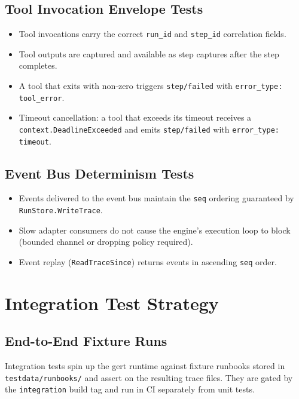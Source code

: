 \subsection{Tool Invocation Envelope Tests}

\begin{itemize}
  \item Tool invocations carry the correct \texttt{run\_id} and \texttt{step\_id} correlation fields.
  \item Tool outputs are captured and available as step captures after the step completes.
  \item A tool that exits with non-zero triggers \texttt{step/failed} with \texttt{error\_type: tool\_error}.
  \item Timeout cancellation: a tool that exceeds its timeout receives a \texttt{context.DeadlineExceeded} and emits \texttt{step/failed} with \texttt{error\_type: timeout}.
\end{itemize}

\subsection{Event Bus Determinism Tests}

\begin{itemize}
  \item Events delivered to the event bus maintain the \texttt{seq} ordering guaranteed by \texttt{RunStore.WriteTrace}.
  \item Slow adapter consumers do not cause the engine's execution loop to block (bounded channel or dropping policy required).
  \item Event replay (\texttt{ReadTraceSince}) returns events in ascending \texttt{seq} order.
\end{itemize}

\section{Integration Test Strategy}

\subsection{End-to-End Fixture Runs}

Integration tests spin up the gert runtime against fixture runbooks stored in \texttt{testdata/runbooks/} and assert on the resulting trace files. They are gated by the \texttt{integration} build tag and run in CI separately from unit tests.

